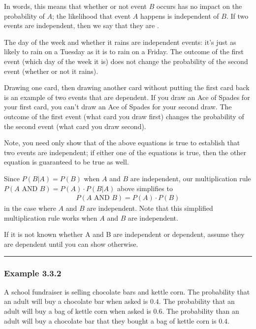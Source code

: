 \documentclass[letterpaper,10pt,english]{jupyterBook}
\begin{document}
\sphinxAtStartPar
In words, this means that whether or not event \(B\) occurs has no impact on the probability of \(A\); the likelihood that event \(A\) happens is independent of \(B\). If two events are  independent, then we say that they are .

\sphinxAtStartPar
The day of the week and whether it rains are independent events: it’s just as likely to rain on a Tuesday as it is to rain on a Friday. The outcome of the first event (which day of the week it is) does not change the probability of the second event (whether or not it rains).

\sphinxAtStartPar
Drawing one card, then drawing another card without putting the first card back is an example of two events that are dependent. If you draw an Ace of Spades for your first card, you can’t draw an Ace of Spades for your second draw. The outcome of the first event (what card you draw first) changes the probability of the second event (what card you draw second).

\sphinxAtStartPar
Note, you need only show that  of the above equations is true to establish that two events are independent; if either one of the equations is true, then the other equation is guaranteed to be true as well.

\sphinxAtStartPar
Since \(P(B|A) = P(B)\) when \(A\) and \(B\) are independent, our multiplication rule \(P(A\text{ AND }B) = P(A) \cdot P(B|A)\) above simplifies to
\begin{equation*}
\begin{split} 
P(A \text{ AND } B) = P(A) \cdot P(B) 
\end{split}
\end{equation*}
\sphinxAtStartPar
in the case where \(A\) and \(B\) are independent. Note that this simplified multiplication rule works  when \(A\) and \(B\) are independent.

\sphinxAtStartPar
If it is not known whether A and B are independent or dependent, assume they are dependent until you can show otherwise.


\bigskip\hrule\bigskip



\subsubsection{Example 3.3.2}
\label{\detokenize{Ch3 Probability/3.3 Multiplication Rules and Independent Events:example-3-3-2}}
\sphinxAtStartPar
A school fundraiser is selling chocolate bars and kettle corn. The probability that an adult will buy a chocolate bar when asked is \(0.4\). The probability that an adult will buy a bag of kettle corn when asked is \(0.6\). The probability than an adult will buy a chocolate bar  that they bought a bag of kettle corn is \(0.4\).
\end{document}
